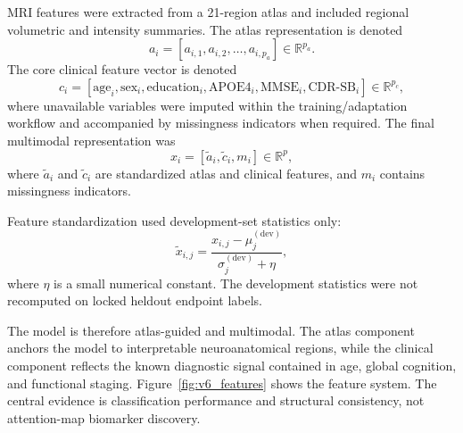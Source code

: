 \documentclass[12pt,a4paper]{article}
\begin{document}
MRI features were extracted from a 21-region atlas and included regional volumetric and intensity summaries. The atlas representation is denoted
\begin{equation}
a_i = \left[a_{i,1},a_{i,2},\ldots,a_{i,p_a}\right] \in \mathbb{R}^{p_a}.
\label{eq:atlas_features}
\end{equation}
The core clinical feature vector is denoted
\begin{equation}
c_i = \left[\mathrm{age}_i,\mathrm{sex}_i,\mathrm{education}_i,\mathrm{APOE4}_i,\mathrm{MMSE}_i,\mathrm{CDR\mbox{-}SB}_i\right] \in \mathbb{R}^{p_c},
\label{eq:clinical_features}
\end{equation}
where unavailable variables were imputed within the training/adaptation workflow and accompanied by missingness indicators when required. The final multimodal representation was
\begin{equation}
x_i = \left[\tilde{a}_i,\tilde{c}_i,m_i\right] \in \mathbb{R}^{p},
\label{eq:feature_concat}
\end{equation}
where $\tilde{a}_i$ and $\tilde{c}_i$ are standardized atlas and clinical features, and $m_i$ contains missingness indicators.

Feature standardization used development-set statistics only:
\begin{equation}
\tilde{x}_{i,j} =
\frac{x_{i,j}-\mu_j^{(\mathrm{dev})}}{\sigma_j^{(\mathrm{dev})}+\eta},
\label{eq:standardization}
\end{equation}
where $\eta$ is a small numerical constant. The development statistics were not recomputed on locked heldout endpoint labels.

The model is therefore atlas-guided and multimodal. The atlas component anchors the model to interpretable neuroanatomical regions, while the clinical component reflects the known diagnostic signal contained in age, global cognition, and functional staging. Figure~\ref{fig:v6_features} shows the feature system. The central evidence is classification performance and structural consistency, not attention-map biomarker discovery.
\end{document}

